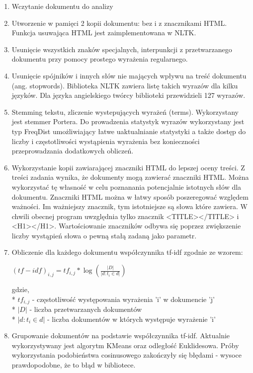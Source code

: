 \documentclass{article}
\begin{document}
\begin{enumerate}
\item Wczytanie dokumentu do analizy
\item Utworzenie w pamięci 2 kopii dokumentu: bez i z znacznikami HTML. Funkcja usuwająca HTML jest zaimplementowana w NLTK.
\item Usunięcie wszystkich znaków specjalnych, interpunkcji z przetwarzanego dokumentu przy pomocy prostego wyrażenia regularnego. 
\item Usunięcie spójników i innych słów nie mających wpływu na treść dokumentu (ang. stopwords). Biblioteka NLTK zawiera listę takich wyrazów dla kilku języków. Dla języka angielskiego twórcy biblioteki przewidzieli 127 wyrazów. 
\item Stemming tekstu, zliczenie wystepujących wyrażeń (terms). Wykorzystany jest stemmer Portera. Do prowadzenia statystyk wyrazów wykorzystany jest typ FreqDist umożliwiający łatwe uaktualnianie statystyki a także dostęp do liczby i częstotliwości wystąpienia wyrażenia bez konieczności przeprowadzania dodatkowych obliczeń. 
\item Wykorzystanie kopii zawiarającej znaczniki HTML do lepszej oceny treści. Z treści zadania wynika, że dokumenty mogą zawierać znaczniki HTML. Można wykorzystać tę własność w celu poznanania potencjalnie istotnych słów dla dokumentu. Znaczniki HTML można w łatwy sposób poszeregować względem ważności. Im ważniejszy znacznik, tym istotniejsze są słowa które zawiera. W chwili obecnej program uwzględnia tylko znacznik <TITLE></TITLE> i <H1></H1>. Wartościowanie znaczników odbywa się poprzez zwiększenie liczby wystąpień słowa o pewną stałą zadaną jako parametr.
\item Obliczenie dla każdego dokumentu współczynnika tf-idf zgodnie ze wzorem: 

\begin{math} (tf-idf)_{i,j} = tf_{i,j} * \log( \frac{|D|}{|{d: t_i \in d}|}) \end{math}

gdzie, \\*
\( tf_{i,j} \) - częstotliwość występowania wyrażenia 'i' w dokumencie 'j' \\*
\( |D| \) - liczba przetwarzanych dokumentów \\*
\( |d:t_i \in d| \) - liczba dokumentów w których występuje wyrażenie 'i'
\item Grupowanie dokumentów na podstawie współczynnika tf-idf. Aktualnie wykorzystywany jest algorytm KMeans oraz odległość Euklidesowa. Próby wykorzystania podobieństwa cosinusowego zakończyły się błędami - wysoce prawdopodobne, że to błąd w bibliotece. 
\end{enumerate}
\end{document}
